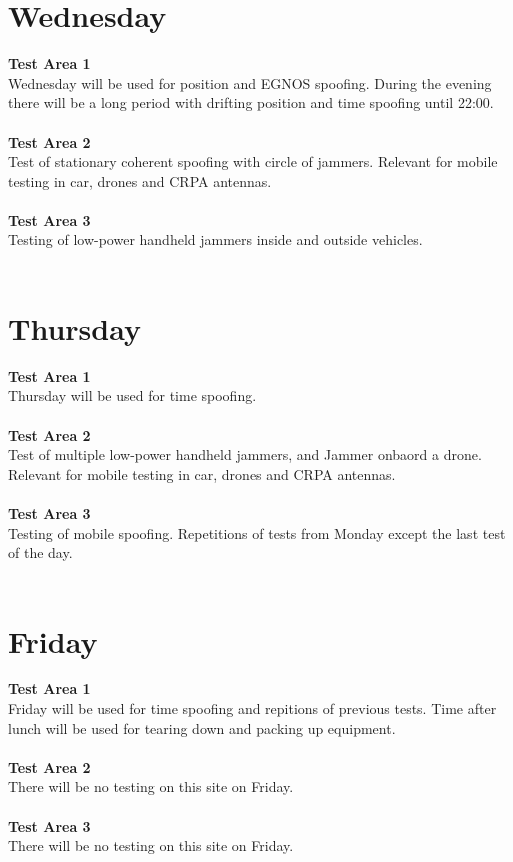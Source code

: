 \documentclass[a4paper]{book}
\begin{document}
\begin{landscape}
\chapter{Wednesday}
\Large \textbf{Test Area 1} \\
Wednesday will be used for position and EGNOS spoofing. During the evening there will be a long period with drifting position and time spoofing until 22:00. \\ \\
\Large \textbf{Test Area 2} \\
Test of stationary coherent spoofing with circle of jammers. Relevant for mobile testing in car, drones and CRPA antennas.\\ \\
\Large \textbf{Test Area 3} \\
Testing of low-power handheld jammers inside and outside vehicles.\\ \\

%

\chapter{Thursday}
\Large \textbf{Test Area 1} \\
Thursday will be used for time spoofing.\\ \\
\Large \textbf{Test Area 2} \\
Test of multiple low-power handheld jammers, and Jammer onbaord a drone. Relevant for mobile testing in car, drones and CRPA antennas.\\ \\
\Large \textbf{Test Area 3} \\
Testing of mobile spoofing. Repetitions of tests from Monday except the last test of the day.\\ \\

%

\chapter{Friday}
\Large \textbf{Test Area 1} \\
Friday will be used for time spoofing and repitions of previous tests. Time after lunch will be used for tearing down and packing up equipment.\\ \\
\Large \textbf{Test Area 2} \\
There will be no testing on this site on Friday.\\ \\
\Large \textbf{Test Area 3} \\
There will be no testing on this site on Friday.\\ \\

%

\end{landscape}
\end{document}
